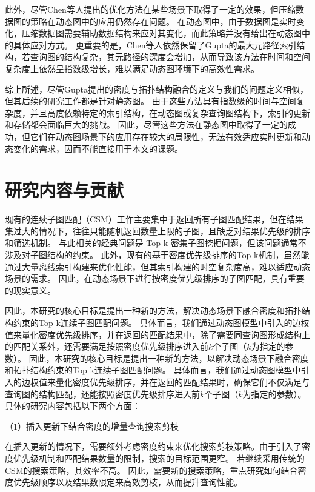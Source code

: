 此外，尽管Chen等人提出的优化方法在某些场景下取得了一定的效果，但压缩数据图的策略在动态图中的应用仍然存在问题。
在动态图中，由于数据图是实时变化，压缩数据图需要辅助数据结构来应对其变化，而此策略并没有给出在动态图中的具体应对方式。
更重要的是，Chen等人依然保留了Gupta的最大元路径索引结构，若查询图的结构复杂，其元路径的深度会增加，从而导致该方法在时间和空间复杂度上依然呈指数级增长，难以满足动态图环境下的高效性需求。


综上所述，尽管Gupta提出的密度与拓扑结构融合的定义与我们的问题定义相似，但其后续的研究工作都是针对静态图。
由于这些方法具有指数级的时间与空间复杂度，并且高度依赖特定的索引结构，在动态图或复杂查询图结构下，索引的更新和存储都会面临巨大的挑战。
因此，尽管这些方法在静态图中取得了一定的成功，但它们在动态图场景下的应用存在较大的局限性，无法有效适应实时更新和动态变化的需求，因而不能直接用于本文的课题。
\section{研究内容与贡献}
现有的连续子图匹配（CSM）工作主要集中于返回所有子图匹配结果，但在结果集过大的情况下，往往只能随机返回数量上限的子图，且缺乏对结果优先级的排序和筛选机制。
与此相关的经典问题是 Top-k 密集子图挖掘问题，但该问题通常不涉及对子图结构的约束。
此外，现有的基于密度优先级排序的Top-k机制，虽然能通过大量离线索引构建来优化性能，但其索引构建的时空复杂度高，难以适应动态场景的需求。
因此，在动态场景下进行按密度优先级排序的子图匹配，具有重要的现实意义。


因此，本研究的核心目标是提出一种新的方法，解决动态场景下融合密度和拓扑结构约束的Top-k连续子图匹配问题。
具体而言，我们通过动态图模型中引入的边权值来量化密度优先级排序，并在返回的匹配结果中，除了需要同查询图形成结构上的匹配关系外，还需要满足按照密度优先级排序进入前$k$个子图（$k$为指定的参数）。
因此，本研究的核心目标是提出一种新的方法，以解决动态场景下融合密度和拓扑结构约束的Top-k连续子图匹配问题。
具体而言，我们通过动态图模型中引入的边权值来量化密度优先级排序，并在返回的匹配结果时，确保它们不仅满足与查询图的结构匹配，还能按照密度优先级排序进入前$k$个子图（$k$为指定的参数）。具体的研究内容包括以下两个方面：

（1）插入更新下结合密度的增量查询搜索剪枝

      在插入更新的情况下，需要额外考虑密度约束来优化搜索剪枝策略。由于引入了密度优先级机制和匹配结果数量的限制，搜索的目标范围更窄。
      若继续采用传统的CSM的搜索策略，其效率不高。
      因此，需要新的搜索策略，重点研究如何结合密度优先级顺序以及结果数限定来高效剪枝，从而提升查询性能。

